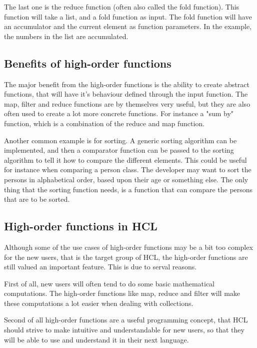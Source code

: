 The last one is the reduce function (often also called the fold function).
This function will take a list, and a fold function as input. 
The fold function will have an accumulator and the current element as function parameters.
In the example, the numbers in the list are accumulated.

\subsection{Benefits of high-order functions}
The major benefit from the high-order functions is the ability to create abstract functions, that will have it's behaviour defined through the input function. 
The map, filter and reduce functions are by themselves very useful, but they are also often used to create a lot more concrete functions. 
For instance a "sum by" function, which is a combination of the reduce and map function. 

Another common example is for sorting. 
A generic sorting algorithm can be implemented, and then a comparator function can be passed to the sorting algorithm to tell it how to compare the different elements.
This could be useful for instance when comparing a person class. 
The developer may want to sort the persons in alphabetical order, based upon their age or something else. 
The only thing that the sorting function needs, is a function that can compare the persons that are to be sorted.

\subsection{High-order functions in HCL}
Although some of the use cases of high-order functions may be a bit too complex for the new users, that is the target group of HCL, the high-order functions are still valued an important feature.
This is due to serval reasons.

First of all, new users will often tend to do some basic mathematical computations. 
The high-order functions like map, reduce and filter will make these computations a lot easier when dealing with collections. 

Second of all high-order functions are a useful programming concept, that HCL should strive to make intuitive and understandable for new users, so that they will be able to use and understand it in their next language.